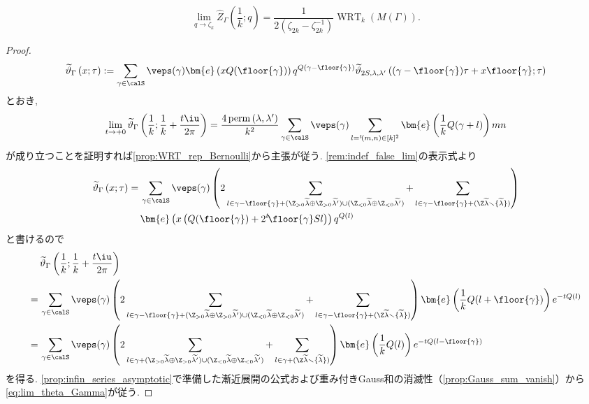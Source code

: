\documentclass[11pt,b5paper,oneside,lualatex]{ltjsarticle} %
\DeclareMathOperator{\WRT}{WRT}
\DeclareMathOperator{\perm}{perm}
\numberwithin{equation}{section} %
\begin{document}
\begin{thm} \label{thm:WRT_HB}
	\[
	\lim_{q \to \zeta_k} \widehat{Z}_{\Gamma} \left( \frac{1}{k}; q \right)
	=
	\frac{1}{2 \left(\zeta_{2k} - \zeta_{2k}^{-1} \right)} \WRT_k(M(\Gamma)).
	\]
\end{thm}

\begin{proof}
	\[
	\widetilde{\vartheta}_{\Gamma} \left( x; \tau \right)
	:= 
	\sum_{\gamma \in \calS} 
	\veps(\gamma)
	\bm{e} \left( x Q(\floor{\gamma}) \right) q^{Q(\gamma - \floor{\gamma})}
	\widetilde{\vartheta}_{2S, \lambda, \lambda'} \left( (\gamma - \floor{\gamma})\tau + x \floor{\gamma}; \tau \right)
	\]
	とおき, 
	\begin{equation} \label{eq:lim_theta_Gamma}
		\lim_{t \to +0} \widetilde{\vartheta}_{\Gamma} \left( \frac{1}{k}; \frac{1}{k} + \frac{t \iu}{2 \pi} \right)
		=
		\frac{4\perm{(\lambda, \lambda')}}{k^2}
		\sum_{\gamma \in \calS} 
		\veps(\gamma)
		\sum_{l = {}^t\!(m, n) \in [k]^2}
		\bm{e}\left( \frac{1}{k} Q(\gamma + l) \right) mn
	\end{equation}
	が成り立つことを証明すれば\cref{prop:WRT_rep_Bernoulli}から主張が従う. 
	\cref{rem:indef_false_lim}の表示式より
	\begin{align}
		\widetilde{\vartheta}_{\Gamma} \left( x; \tau \right)
		= \, 
		&\sum_{\gamma \in \calS} 
		\veps(\gamma)
		\left(
		2 \sum_{l \in \gamma - \floor{\gamma} + (\Z_{> 0} \widetilde{\lambda} \oplus \Z_{> 0} \widetilde{\lambda'}) \cup (\Z_{< 0} \widetilde{\lambda} \oplus \Z_{< 0} \widetilde{\lambda'})}
		+
		\sum_{l \in \gamma - \floor{\gamma} + (\Z \widetilde{\lambda} \smallsetminus \{ \widetilde{\lambda} \} )}
		\right)
		\\
		&\bm{e} \left( x \left( Q(\floor{\gamma}) + 2 {}^t\!\floor{\gamma} S l \right) \right) 
		q^{Q\left(  l \right) }
	\end{align}
	と書けるので
	\begin{align}
		&\widetilde{\vartheta}_{\Gamma} \left( \frac{1}{k}; \frac{1}{k} + \frac{t \iu}{2 \pi} \right)
		\\
		= \, 
		&\sum_{\gamma \in \calS} 
		\veps(\gamma)
		\left(
		2 \sum_{l \in \gamma - \floor{\gamma} + (\Z_{> 0} \widetilde{\lambda} \oplus \Z_{> 0} \widetilde{\lambda'}) \cup (\Z_{< 0} \widetilde{\lambda} \oplus \Z_{< 0} \widetilde{\lambda'})}
		+
		\sum_{l \in \gamma - \floor{\gamma} + (\Z \widetilde{\lambda} \smallsetminus \{ \widetilde{\lambda} \} )}
		\right)
		\bm{e} \left( \frac{1}{k} Q(l + \floor{\gamma}) \right) 
		e^{-t Q \left( l \right) }
		\\
		= \, 
		&\sum_{\gamma \in \calS} 
		\veps(\gamma)
		\left(
		2 \sum_{l \in \gamma + (\Z_{> 0} \widetilde{\lambda} \oplus \Z_{> 0} \widetilde{\lambda'}) \cup (\Z_{< 0} \widetilde{\lambda} \oplus \Z_{< 0} \widetilde{\lambda'})}
		+
		\sum_{l \in \gamma + (\Z \widetilde{\lambda} \smallsetminus \{ \widetilde{\lambda} \} )}
		\right)
		\bm{e} \left( \frac{1}{k} Q(l) \right) 
		e^{-t Q \left( l - \floor{\gamma} \right) }
	\end{align}
	を得る. 
	\cref{prop:infin_series_asymptotic}で準備した漸近展開の公式および重み付きGauss和の消滅性（\cref{prop:Gauss_sum_vanish}）から	\cref{eq:lim_theta_Gamma}が従う. 
\end{proof}
\end{document}
